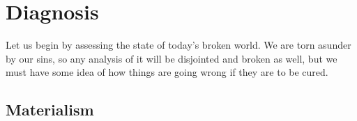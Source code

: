 \documentclass[letterpaper]{article}
\begin{document}



\section{Diagnosis}

Let us begin by assessing the state of today's broken world. We are torn asunder by our sins, so any analysis of it will be disjointed and broken as well, but we must have some idea of how things are going wrong if they are to be cured.

\subsection{Materialism}
\end{document}
